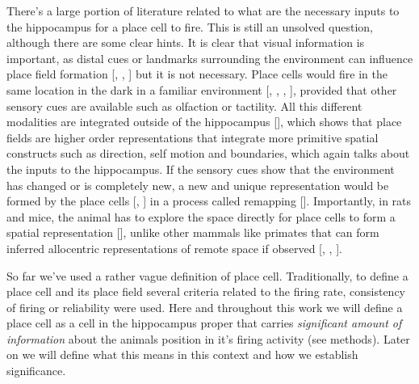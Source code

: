 There's a large portion of literature related to what are the necessary inputs to the hippocampus for a place cell to fire. 
This is still an unsolved question, although there are some clear hints. 
It is clear that visual information is important, as distal cues or landmarks surrounding the environment can influence place field formation [\cite{mullerkubie1987}, \cite{okeefe1978}, \cite{yoganarasimha2005}] but it is not necessary. 
Place cells would fire in the same location in the dark in a familiar environment [\cite{save2000}, \cite{zhang2014}, \cite{markus1994}, \cite{quirk1990}], provided that other sensory cues are available such as olfaction or tactility. 
All this different modalities are integrated outside of the hippocampus [\cite{jeffery2007}], which shows that place fields are higher order representations that integrate more primitive spatial constructs such as direction, self motion and boundaries, which again talks about the inputs to the hippocampus. 
If the sensory cues show that the environment has changed or is completely new, a new and unique representation would be formed by the place cells [\cite{anderson2003}, \cite{okeefe1978}] in a process called remapping [\cite{mullerkubie1987}]. 
Importantly, in rats and mice, the animal has to explore the space directly for place cells to form a spatial representation [\cite{rowland2011}], unlike other mammals like primates that can form inferred allocentric representations of remote space if observed [\cite{rolls1999}, \cite{rolls1997}, \cite{rolls1995}]. 

So far we've used a rather vague definition of place cell. 
Traditionally, to define a place cell and its place field several criteria related to the firing rate, consistency of firing or reliability were used. 
Here and throughout this work we will define a place cell as a cell in the hippocampus proper that carries \textit{significant amount of information} about the animals position in it's firing activity (see methods). Later on we will define what this means in this context and how we establish significance.  

